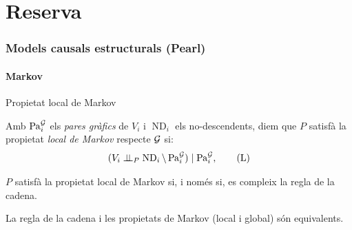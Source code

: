 \documentclass{bestbeamer}
\begin{document}
\appendix
\part{Reserva}

\section{Models causals estructurals (Pearl)}
\subsection{Markov}
\begin{frame}{Propietat local de Markov}
\small
\begin{definition}\label{property:localmentmarkov}
Amb $\operatorname{Pa}_i^{\mathcal{G}}$ els \textit{pares gràfics} de $V_i$ i $\operatorname{ND}_i$ els no-descendents, diem que $P$ satisfà la propietat \emph{local de Markov} respecte $\mathcal{G}$ si:
\begin{equation}\label{eq:markovlocal}
(V_i\perp\!\!\!\perp_{P}\operatorname{ND}_i\setminus\operatorname{Pa}_i^\mathcal{G})\mid \operatorname{Pa}_i^\mathcal{G}, \tag{L}
\end{equation}
\end{definition}
\begin{theorem}\label{th:equivalencialocalfactoritzar}
$P$ satisfà la propietat local de Markov si, i només si, es compleix la regla de la cadena.
\end{theorem}
\begin{theorem}\label{th:equivalenciapropietatsmarkov}
La regla de la cadena i les propietats de Markov (local i global) són equivalents.
\end{theorem}
\end{frame}
\end{document}
